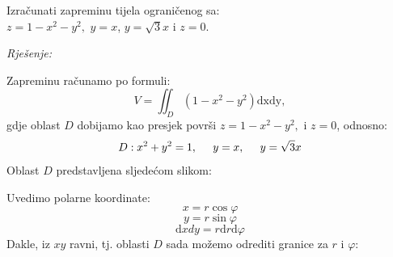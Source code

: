 \documentclass[a4paper,11pt]{article}
\begin{document}
\begin{tcolorbox}[colback=brown!35!white,colframe=white!75!white,title= $$\bullet \bullet \bullet$$]
         \begin{zadatak}
Izračunati zapreminu tijela ograničenog sa:\\
$z = 1-x^2 - y^2, $ $y=x$, $y= \sqrt{3}x$ i $z=0.$
\end{zadatak}
\end{tcolorbox}
\emph{Rješenje: }
\begin{center}
\end{center}
Zapreminu računamo po formuli:
$$V = \iint_{D} (1-x^2 - y^2)\mathrm{dx}\mathrm{dy},$$
gdje  oblast $D$ dobijamo kao presjek površi $z = 1-x^2 - y^2, $ i $z=0$, odnosno:
$$D: x^2 + y^2 =1, \hspace{0.5 cm} y=x, \hspace{0.5 cm} y= \sqrt{3}x$$ 
Oblast $D  $ predstavljena sljedećom slikom:
\begin{center}
\end{center}
Uvedimo polarne koordinate:
$$x = r \cos{\varphi}$$
$$y = r \sin{\varphi}$$
 $$\mathrm dxdy = r  \mathrm d r  \mathrm d\varphi$$
Dakle, iz $xy$ ravni, tj. oblasti $D$ sada možemo odrediti granice za $r$  i $\varphi$:
\end{document}
